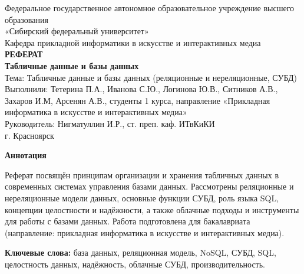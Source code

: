 \documentclass[14pt,a4paper]{extarticle}
\begin{document}
\begin{titlepage}
  \thispagestyle{empty}
  \begin{center}
    \vspace*{2.5cm}
    {\large Федеральное государственное автономное образовательное учреждение высшего образования \\[3pt]
    «Сибирский федеральный университет» \\[6pt]
    Кафедра прикладной информатики в искусстве и интерактивных медиа \\[36pt]}
    {\LARGE\bfseries РЕФЕРАТ \\[12pt]}
    {\Large\bfseries Табличные данные и базы данных \\[24pt]}
    {\normalsize Тема: Табличные данные и базы данных (реляционные и нереляционные, СУБД) \\[12pt]}
    {\normalsize Выполнили: Тетерина П.А., Иванова С.Ю., Логинова Ю.В., Ситников А.В., Захаров И.М, Арсенян А.В., студенты 1 курса, направление «Прикладная информатика в искусстве и интерактивных медиа» \\[6pt]
    Руководитель: Нигматуллин И.Р., ст. преп. каф. ИТвКиКИ \\[36pt]}
    {\normalsize г. Красноярск }
  \end{center}
\end{titlepage}

\setcounter{page}{2}

\begin{center}
  \textbf{Аннотация}
\end{center}
Реферат посвящён принципам организации и хранения табличных данных в современных системах управления базами данных. Рассмотрены реляционные и нереляционные модели данных, основные функции СУБД, роль языка SQL, концепции целостности и надёжности, а также облачные подходы и инструменты для работы с базами данных. Работа подготовлена для бакалавриата (направление: прикладная информатика в искусстве и интерактивных медиа).

\medskip
\textbf{Ключевые слова:} база данных, реляционная модель, NoSQL, СУБД, SQL, целостность данных, надёжность, облачные СУБД, производительность.

\newpage
\tableofcontents
\newpage
\end{document}
